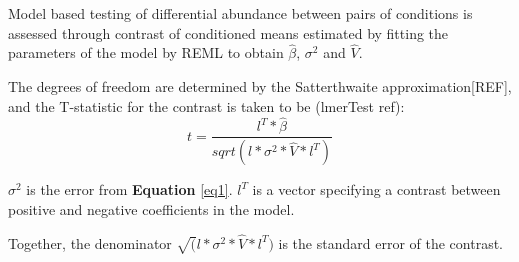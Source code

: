 \documentclass[11pt]{elife}\usepackage[]{graphicx}\usepackage[]{color}
\begin{document}
Model based testing of differential abundance between pairs of conditions
is assessed through contrast of conditioned means estimated by fitting the
parameters of the model by REML to obtain $\hat{\beta}$, $\sigma^2$ and
$\hat{V}$.

The degrees of freedom are determined by the Satterthwaite approximation[REF],
and the T-statistic for the contrast is taken to be (lmerTest ref): \\

\begin{equation}
	t = \frac{l^T * \hat{\beta}}{sqrt(l * \sigma^2 * \hat{V} * l^T)}
\end{equation}

$\sigma^2$ is the error from \textbf{Equation} \ref{eq1}.
$l^T$ is a vector specifying a contrast between positive and 
negative coefficients in the model.

Together, the denominator $\sqrt(l * \sigma^2 * \hat{V} * l^T)$ is the 
standard error of the contrast.
\end{document}

